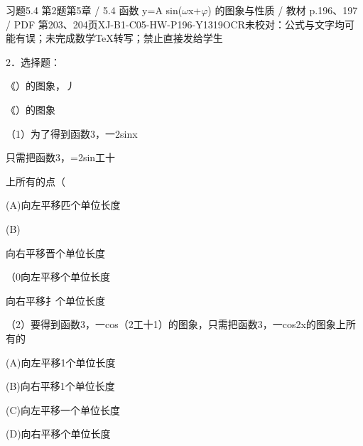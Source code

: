 \begin{bankitem}{习题5.4 第2题}{第5章 / 5.4 函数 y=A sin(\ensuremath{\omega}x+\ensuremath{\varphi}) 的图象与性质 / 教材 p.196、197 / PDF 第203、204页}{XJ-B1-C05-HW-P196-Y1319}{OCR未校对：公式与文字均可能有误；未完成数学TeX转写；禁止直接发给学生}
\begin{ocrdraft}
\par
2．选择题：
\par
《）的图象，丿
\par
《）的图象
\par
（1）为了得到函数3，一2sinx
\par
只需把函数3，=2sin工十
\par
上所有的点（
\par
(A)向左平移匹个单位长度
\par
(B)
\par
向右平移晋个单位长度
\par
（0向左平移个单位长度
\par
向右平移扌个单位长度
\par
[教材p.197 / PDF第204页]
\par
（2）要得到函数3，一cos（2工十1）的图象，只需把函数3，一cos2x的图象上所有的
\par
(A)向左平移1个单位长度
\par
(B)向右平移1个单位长度
\par
(C)向左平移一个单位长度
\par
(D)向右平移个单位长度
\end{ocrdraft}
\end{bankitem}
